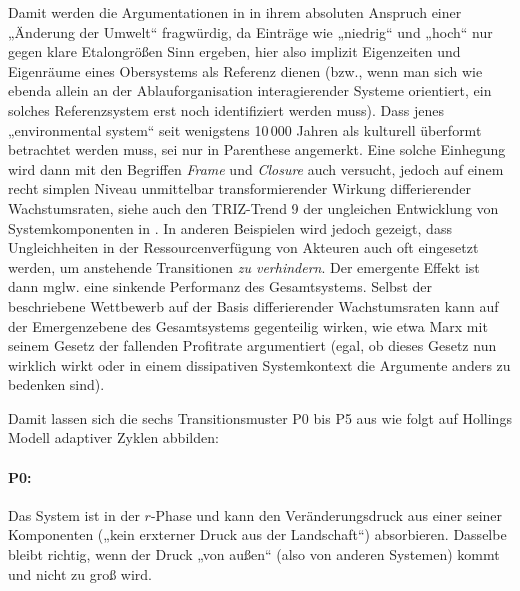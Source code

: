 \documentclass[12pt,a4paper]{article}
\begin{document}
Damit werden die Argumentationen in \cite[Fig. 4]{Geels2007} in ihrem
absoluten Anspruch einer „Änderung der Umwelt“ fragwürdig, da Einträge wie
„niedrig“ und „hoch“ \cite[Tabelle 1]{Geels2007} nur gegen klare Etalongrößen
Sinn ergeben, hier also implizit Eigenzeiten und Eigenräume eines Obersystems
als Referenz dienen (bzw., wenn man sich wie ebenda allein an der
Ablauforganisation interagierender Systeme orientiert, ein solches
Referenzsystem erst noch identifiziert werden muss). Dass jenes „environmental
system“ seit wenigstens 10\,000 Jahren als kulturell überformt betrachtet
werden muss, sei nur in Parenthese angemerkt. Eine solche Einhegung wird dann
mit den Begriffen \emph{Frame} und \emph{Closure} \cite[S. 405]{Geels2007}
auch versucht, jedoch auf einem recht simplen Niveau unmittelbar
transformierender Wirkung differierender Wachstumsraten, siehe auch den
TRIZ-Trend 9 der ungleichen Entwicklung von Systemkomponenten in
\cite{TESE2018}.  In anderen Beispielen wird jedoch gezeigt, dass
Ungleichheiten in der Ressourcenverfügung von Akteuren auch oft eingesetzt
werden, um anstehende Transitionen \emph{zu verhindern}.  Der emergente Effekt
ist dann mglw. eine sinkende Performanz des Gesamtsystems.  Selbst der
beschriebene Wettbewerb auf der Basis differierender Wachstumsraten kann auf
der Emergenzebene des Gesamtsystems gegenteilig wirken, wie etwa Marx mit
seinem Gesetz der fallenden Profitrate argumentiert (egal, ob dieses Gesetz
nun wirklich wirkt oder in einem dissipativen Systemkontext die Argumente
anders zu bedenken sind).

Damit lassen sich die sechs Transitionsmuster P0 bis P5 aus \cite{Geels2007}
wie folgt auf Hollings Modell adaptiver Zyklen abbilden:

\paragraph{P0:}
Das System ist in der $r$-Phase und kann den Veränderungsdruck aus einer
seiner Komponenten („kein erxterner Druck aus der Landschaft“) absorbieren.
Dasselbe bleibt richtig, wenn der Druck „von außen“ (also von anderen
Systemen) kommt und nicht zu groß wird.
\end{document}
